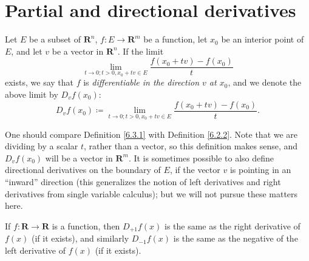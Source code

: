 \section{Partial and directional derivatives}\label{sec 6.3}

\begin{definition}\label{6.3.1}
    Let \(E\) be a subset of \(\mathbf{R}^n\), \(f : E \to \mathbf{R}^m\) be a function, let \(x_0\) be an interior point of \(E\), and let \(v\) be a vector in \(\mathbf{R}^n\).
    If the limit
    \[
        \lim_{t \to 0 ; t > 0, x_0 + tv \in E} \frac{f(x_0 + tv) - f(x_0)}{t}
    \]
    exists, we say that \(f\) is \emph{differentiable in the direction \(v\) at \(x_0\)}, and we denote the above limit by \(D_v f(x_0)\):
    \[
        D_v f(x_0) \coloneqq \lim_{t \to 0 ; t > 0, x_0 + tv \in E} \frac{f(x_0 + tv) - f(x_0)}{t}.
    \]
\end{definition}

\begin{remark}\label{6.3.2}
    One should compare Definition \ref{6.3.1} with Definition \ref{6.2.2}.
    Note that we are dividing by a scalar \(t\), rather than a vector, so this definition makes sense, and \(D_v f(x_0)\) will be a vector in \(\mathbf{R}^m\).
    It is sometimes possible to also define directional derivatives on the boundary of \(E\), if the vector \(v\) is pointing in an ``inward'' direction
    (this generalizes the notion of left derivatives and right derivatives from single variable calculus);
    but we will not pursue these matters here.
\end{remark}

\begin{example}\label{6.3.3}
    If \(f : \mathbf{R} \to \mathbf{R}\) is a function, then \(D_{+1} f(x)\) is the same as the right derivative of \(f(x)\) (if it exists), and similarly \(D_{-1} f(x)\) is the same as the negative of the left derivative of \(f(x)\) (if it exists).
\end{example}

